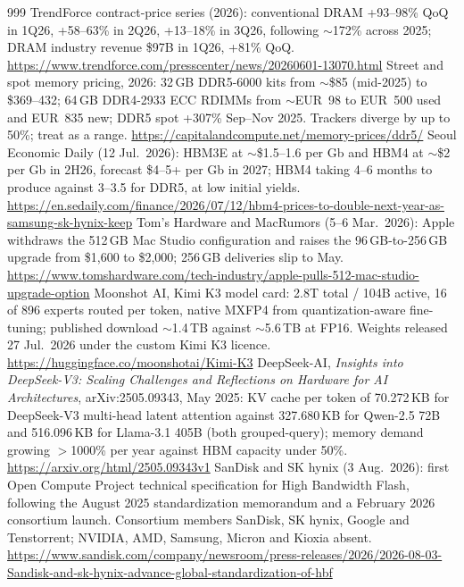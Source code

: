 \begin{thebibliography}{999}
 TrendForce contract-price series (2026): conventional DRAM +93--98\% QoQ in 1Q26, +58--63\% in 2Q26, +13--18\% in 3Q26, following $\sim$172\% across 2025; DRAM industry revenue \$97B in 1Q26, +81\% QoQ. \url{https://www.trendforce.com/presscenter/news/20260601-13070.html}
 Street and spot memory pricing, 2026: 32\,GB DDR5-6000 kits from $\sim$\$85 (mid-2025) to \$369--432; 64\,GB DDR4-2933 ECC RDIMMs from $\sim$EUR~98 to EUR~500 used and EUR~835 new; DDR5 spot +307\% Sep--Nov 2025. Trackers diverge by up to 50\%; treat as a range. \url{https://capitalandcompute.net/memory-prices/ddr5/}
 Seoul Economic Daily (12 Jul.\ 2026): HBM3E at $\sim$\$1.5--1.6 per Gb and HBM4 at $\sim$\$2 per Gb in 2H26, forecast \$4--5+ per Gb in 2027; HBM4 taking 4--6 months to produce against 3--3.5 for DDR5, at low initial yields. \url{https://en.sedaily.com/finance/2026/07/12/hbm4-prices-to-double-next-year-as-samsung-sk-hynix-keep}
 Tom's Hardware and MacRumors (5--6 Mar.\ 2026): Apple withdraws the 512\,GB Mac Studio configuration and raises the 96\,GB-to-256\,GB upgrade from \$1,600 to \$2,000; 256\,GB deliveries slip to May. \url{https://www.tomshardware.com/tech-industry/apple-pulls-512-mac-studio-upgrade-option}
 Moonshot AI, Kimi K3 model card: 2.8T total / 104B active, 16 of 896 experts routed per token, native MXFP4 from quantization-aware fine-tuning; published download $\sim$1.4\,TB against $\sim$5.6\,TB at FP16. Weights released 27 Jul.\ 2026 under the custom Kimi K3 licence. \url{https://huggingface.co/moonshotai/Kimi-K3}
 DeepSeek-AI, \emph{Insights into DeepSeek-V3: Scaling Challenges and Reflections on Hardware for AI Architectures}, arXiv:2505.09343, May 2025: KV cache per token of 70.272\,KB for DeepSeek-V3 multi-head latent attention against 327.680\,KB for Qwen-2.5 72B and 516.096\,KB for Llama-3.1 405B (both grouped-query); memory demand growing $>$1000\% per year against HBM capacity under 50\%. \url{https://arxiv.org/html/2505.09343v1}
 SanDisk and SK hynix (3 Aug.\ 2026): first Open Compute Project technical specification for High Bandwidth Flash, following the August 2025 standardization memorandum and a February 2026 consortium launch. Consortium members SanDisk, SK hynix, Google and Tenstorrent; NVIDIA, AMD, Samsung, Micron and Kioxia absent. \url{https://www.sandisk.com/company/newsroom/press-releases/2026/2026-08-03-Sandisk-and-sk-hynix-advance-global-standardization-of-hbf}

\end{thebibliography}
